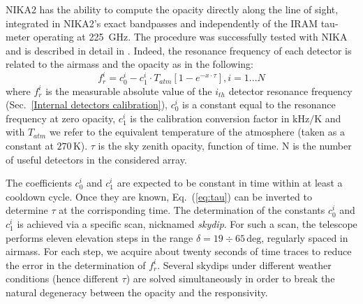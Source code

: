\documentclass[]{aa} %
\begin{document}
NIKA2 has the ability to compute the opacity directly along the line of sight, integrated in NIKA2's exact bandpasses and independently of the IRAM tau-meter operating at 225~GHz. The procedure was successfully tested with NIKA and is described in detail in \cite{Catalano2014}. Indeed, the resonance frequency of each detector is related to the airmass and the opacity as in the following:
\begin{equation}\label{eq:skydip}
f^{i}_{r} = c^{i}_0 - c^{i}_1 \cdot T_{atm}[1 - e^{- x \cdot \tau}],  i = 1 ... N
\label{eq:tau}
\end{equation}
where $f^{i}_{r}$ is the measurable absolute value of the $i_{th}$ detector resonance frequency (Sec.~\ref{Internal detectors calibration}), $c^{i}_0$ is a constant equal to the resonance frequency at zero opacity, $c^{i}_1$ is the calibration conversion factor in $\mathrm{kHz/K}$ and with $T_{atm}$ we refer to the equivalent temperature of the atmosphere (taken as a constant at $270\,\mathrm{K}$). $\tau$ is the sky zenith opacity, function of time. N is the number of useful detectors in the considered array. 

The coefficients $c^{i}_0$ and $c^{i}_1$ are expected to be constant in time within at least a cooldown cycle. Once they are known, Eq.~(\ref{eq:tau}) can be inverted to determine $\tau$ at the corrisponding time. The determination of the constants $c^{i}_0$ and $c^{i}_1$ is achieved via a specific scan, nicknamed \emph{skydip}. For such a scan, the telescope performs eleven elevation steps in the range $\delta = 19\div65\,\mathrm{deg}$, regularly spaced in airmass. For each step, we acquire about twenty seconds of time traces to reduce the error in the determination of $f^{i}_{r}$. Several skydips under different weather conditions (hence different $\tau$) are solved simultaneously in order to break the natural degeneracy between the opacity and the responsivity.
\end{document}
